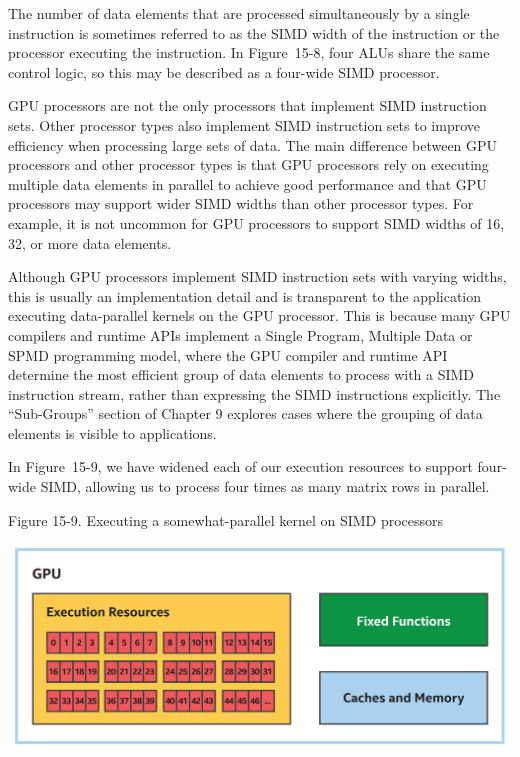 The number of data elements that are processed simultaneously by a single instruction is sometimes referred to as the SIMD width of the instruction or the processor executing the instruction. In Figure 15-8, four ALUs share the same control logic, so this may be described as a four-wide SIMD processor.\par

GPU processors are not the only processors that implement SIMD instruction sets. Other processor types also implement SIMD instruction sets to improve efficiency when processing large sets of data. The main difference between GPU processors and other processor types is that GPU processors rely on executing multiple data elements in parallel to achieve good performance and that GPU processors may support wider SIMD widths than other processor types. For example, it is not uncommon for GPU processors to support SIMD widths of 16, 32, or more data elements.\par

\begin{tcolorbox}[colback=blue!5!white,colframe=blue!75!black, title=PROGRAMMING MODELS: SPMD AND SIMD]
Although GPU processors implement SIMD instruction sets with varying widths, this is usually an implementation detail and is transparent to the application executing data-parallel kernels on the GPU processor. This is because many GPU compilers and runtime APIs implement a Single Program, Multiple Data or SPMD programming model, where the GPU compiler and runtime API determine the most efficient group of data elements to process with a SIMD instruction stream, rather than expressing the SIMD instructions explicitly. The “Sub-Groups” section of Chapter 9 explores cases where the grouping of data elements is visible to applications.
\end{tcolorbox}

In Figure 15-9, we have widened each of our execution resources to support four-wide SIMD, allowing us to process four times as many matrix rows in parallel.\par

\hspace*{\fill} \par %
Figure 15-9. Executing a somewhat-parallel kernel on SIMD processors
\begin{center}
	\includegraphics[width=1.0\textwidth]{content/chapter-15/images/7}
\end{center}


